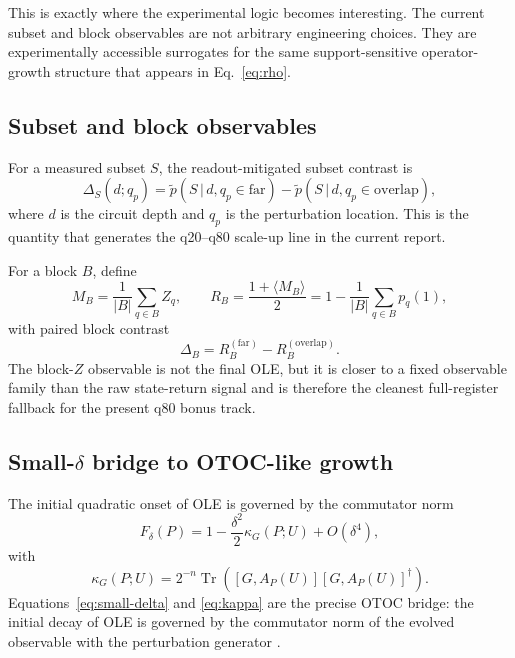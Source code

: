 \documentclass[11pt]{article}
\newcommand{\Tr}{\operatorname{Tr}}
\begin{document}
This is exactly where the experimental logic becomes interesting.
The current subset and block observables are not arbitrary engineering choices.
They are experimentally accessible surrogates for the same support-sensitive operator-growth structure that appears in Eq.~\eqref{eq:rho}.

\subsection{Subset and block observables}

For a measured subset $S$, the readout-mitigated subset contrast is
\begin{equation}
\Delta_S(d;q_p)
=
\tilde p(S\,|\,d,q_p\in\mathrm{far})
-
\tilde p(S\,|\,d,q_p\in\mathrm{overlap}),
\label{eq:subset-contrast}
\end{equation}
where $d$ is the circuit depth and $q_p$ is the perturbation location.
This is the quantity that generates the q20--q80 scale-up line in the current report.

For a block $B$, define
\begin{equation}
M_B=\frac{1}{|B|}\sum_{q\in B} Z_q,
\qquad
R_B=\frac{1+\langle M_B\rangle}{2}
=
1-\frac{1}{|B|}\sum_{q\in B}p_q(1),
\label{eq:block-z}
\end{equation}
with paired block contrast
\begin{equation}
\Delta_B=R_B^{(\mathrm{far})}-R_B^{(\mathrm{overlap})}.
\label{eq:block-contrast}
\end{equation}
The block-$Z$ observable is not the final OLE, but it is closer to a fixed observable family than the raw state-return signal and is therefore the cleanest full-register fallback for the present q80 bonus track.

\subsection{Small-\texorpdfstring{$\delta$}{delta} bridge to OTOC-like growth}

The initial quadratic onset of OLE is governed by the commutator norm
\begin{equation}
F_\delta(P)
=
1
-
\frac{\delta^2}{2}\kappa_G(P;U)
+
O(\delta^4),
\label{eq:small-delta}
\end{equation}
with
\begin{equation}
\kappa_G(P;U)
=
2^{-n}\Tr\!\left([G,A_P(U)][G,A_P(U)]^\dagger\right).
\label{eq:kappa}
\end{equation}
Equations~\eqref{eq:small-delta} and \eqref{eq:kappa} are the precise OTOC bridge:
the initial decay of OLE is governed by the commutator norm of the evolved observable with the perturbation generator
\cite{yan2020information,algorithmiq2026ole}.
\end{document}
